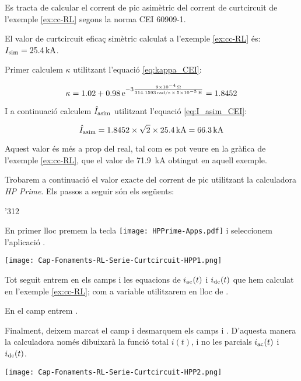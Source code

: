 \begin{exemple}\label{ex:corrent-pic}
    Es tracta de calcular el corrent de pic asimètric del corrent de curtcircuit de l'exemple \ref{ex:cc-RL} segons la norma CEI 60909-1.

    El valor de curtcircuit eficaç simètric calculat a l'exemple \vref{ex:cc-RL} és: $I_\mathrm{sim}= \SI{25,4}{kA}$.

    Primer calculem $\kappa$ utilitzant l'equació \eqref{eq:kappa_CEI}:

    \[
    \kappa = \num{1,02} + \num{0,98} \,\mathrm{e}^{-3\frac{\SI{9e-4}{\ohm}}{\SI{314,1593}{rad/s}\, \times\, \SI{5e-5}{H}}} = \num{1,8452}
    \]

    I a continuació calculem $\hat{I}_\mathrm{asim}$ utilitzant l'equació \eqref{eq:I_asim_CEI}:

    \[
    \hat{I}_\mathrm{asim} = \num{1,8452} \times \sqrt{2} \times \SI{25,4}{kA} = \SI{66,3}{kA}
    \]

    Aquest valor és més a prop del real, tal com es pot veure en la gràfica de l'exemple  \ref{ex:cc-RL}, que el valor de  \SI{71,9}{kA} obtingut en aquell exemple.

    Trobarem a continuació el valor exacte  del corrent de pic utilitzant la calculadora  \emph{HP Prime}.
     Els passos a seguir són els següents:

     \begin{dingautolist}{'312}

        \item En primer lloc premem la tecla \texttt{[image: HPPrime-Apps.pdf]} i seleccionem l'aplicació .

             \texttt{[image: Cap-Fonaments-RL-Serie-Curtcircuit-HPP1.png]}

        \item Tot seguit entrem en els camps  i  les equacions de $i_\mathrm{ac}(t)$ i $i_\mathrm{dc}(t)$ que hem calculat en l'exemple \vref{ex:cc-RL}; com a variable utilitzarem  en lloc de .

            En el camp  entrem .

            Finalment, deixem marcat el camp  i desmarquem els camps  i . D'aquesta manera la calculadora només dibuixarà la funció total $i(t)$, i no les parcials $i_\mathrm{ac}(t)$ i $i_\mathrm{dc}(t)$.


            \texttt{[image: Cap-Fonaments-RL-Serie-Curtcircuit-HPP2.png]}


\end{dingautolist}
\end{exemple}
